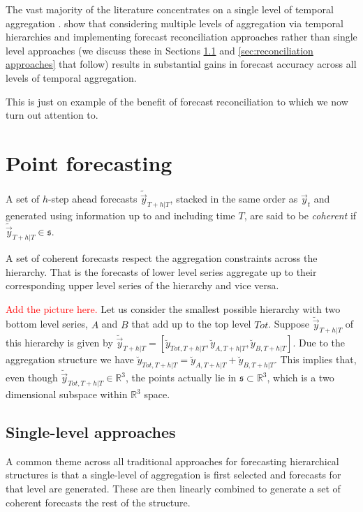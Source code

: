 \documentclass[graybox]{svmult}
\begin{document}
The vast majority of the literature concentrates on a single level of temporal aggregation \citep[there are some notable exceptions such as,][]{AndEtAl2011,KouEtAl2014}. \cite{AthEtAl2017} show that considering multiple levels of aggregation via temporal hierarchies and implementing forecast reconciliation approaches rather than single level approaches (we discuss these in Sections \ref{sec:single level approaches} and \ref{sec:reconciliation approaches} that follow) results in substantial gains in forecast accuracy across all levels of temporal aggregation.

This is just on example of the benefit of forecast reconciliation to which we now turn out attention to.


\section{Point forecasting}\label{sec:point forecasting}

\begin{definition}
A set of $h$-step ahead forecasts $\tilde{\vec{y}}_{T+h|T}$, stacked in the same order as $\vec{y}_{t}$ and generated using information up to and including time $T$,
are said to be \textit{coherent} if $\tilde{\vec{y}}_{T+h|T} \in \mathfrak{s}$.
  \label{def:coherence}
\end{definition}

A set of coherent forecasts respect the aggregation constraints across the hierarchy. That is the forecasts of lower level series aggregate up to their corresponding upper level series of the hierarchy and vice versa.

\textcolor{red}{Add the picture here.}
Let us consider the smallest possible hierarchy with two bottom level series, $A$ and $B$ that add up to the top level $Tot$. Suppose $\breve{\vec{y}}_{T+h|T}$ of this hierarchy is given by $\breve{\vec{y}}_{T+h|T} = [\breve{y}_{Tot,T+h|T},\breve{y}_{A,T+h|T}, \breve{y}_{B,T+h|T}]$. Due to the aggregation structure we have $\breve{y}_{Tot,T+h|T}=\breve{y}_{A,T+h|T}+\breve{y}_{B,T+h|T}$. This implies that, even though  $\breve{\vec{y}}_{Tot,T+h|T} \in \mathbb{R}^3$, the points actually lie in $\mathfrak{s}\subset \mathbb{R}^3$, which is a two dimensional subspace within $\mathbb{R}^3$ space.

\subsection{Single-level approaches}\label{sec:single level approaches}
A common theme across all traditional approaches for forecasting hierarchical structures is that a single-level of aggregation is first selected and forecasts for that level are generated. These are then linearly combined to generate a set of coherent forecasts the rest of the structure.
\end{document}
